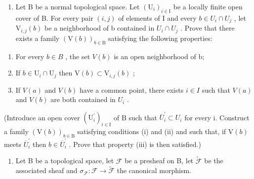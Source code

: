 \begin{enumerate}
\def\labelenumi{\arabic{enumi})}
\setcounter{enumi}{6}
\tightlist
\item
  Let B be a normal topological space. Let \((\mathrm{U}_{i})_{i\in\mathrm{I}}\) be a locally finite open cover of B. For every pair \((i,j)\) of elements of I and every \(b\in U_{i}\cap U_{j}\) , let \(\mathrm{V}_{i,j}(b)\) be a neighborhood of b contained in \(U_{i}\cap U_{j}\) . Prove that there exists a family \((\mathrm{V}(b))_{b\in\mathrm{B}}\) satisfying the following properties:
\end{enumerate}

\begin{enumerate}
\def\labelenumi{(\roman{enumi})}
\item
  For every \(b \in B\) , the set \(V(b)\) is an open neighborhood of b;
\item
  If \(b \in \mathrm{U}_i \cap \mathrm{U}_j\) then \(\mathrm{V}(b) \subset \mathrm{V}_{i,j}(b)\) ;
\item
  If \(V(a)\) and \(V(b)\) have a common point, there exists \(i \in I\) such that \(V(a)\) and \(V(b)\) are both contained in \(U_i\) .
\end{enumerate}

(Introduce an open cover \((\mathrm{U}_{i}^{\prime})_{i\in\mathrm{I}}\) of B such that \(\overline{U}_{i}^{\prime}\subset U_{i}\) for every i. Construct a family \((\mathrm{V}(b))_{b\in\mathrm{B}}\) satisfying conditions (i) and (ii) and such that, if \(\mathrm{V}(b)\) meets \(\overline{U}_{i}^{\prime}\) then \(b\in\overline{U}_{i}^{\prime}\) . Prove that property (iii) is then satisfied.)

\begin{enumerate}
\def\labelenumi{\arabic{enumi})}
\setcounter{enumi}{7}
\tightlist
\item
  Let B be a topological space, let \(\mathcal{F}\) be a presheaf on B, let \(\widetilde{\mathcal{F}}\) be the associated sheaf and \(\sigma_{\mathcal{F}}\colon \mathcal{F}\to \widetilde{\mathcal{F}}\) the canonical morphism.
\end{enumerate}

